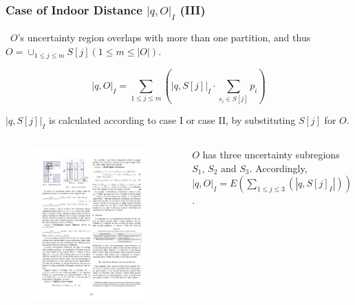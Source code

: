 \begin{frame}
\frametitle{Case of Indoor Distance $|q, O|_I$ (III)}

~$O$'s uncertainty region overlaps with more than one partition, and thus $O = \cup_{1 \leq j \leq m}S[j](1 \leq m \leq |O|)$.

\begin{equation}
  |q, O|_I = \sum_{1 \leq j \leq m}(|q,S[j]|_I \cdot \sum_{s_i \in S[j]}p_i)
\end{equation}

$|q,S[j]|_I$ is calculated according to case I or case II, by substituting $S[j]$ for $O$.

\vspace{-5pt}
\begin{columns}[c]

  \begin{figure}[tb]
    \includegraphics[width=\columnwidth]{figures/2-6/2-6-5.pdf}
  \end{figure}

  \begin{example}
    $O$ has three uncertainty subregions $S_1$, $S_2$ and $S_3$. Accordingly, $|q,O|_I = E(\sum_{1 \leq j \leq 3}(|q, S[j]_I|))$.
  \end{example}

\end{columns}

\end{frame}

